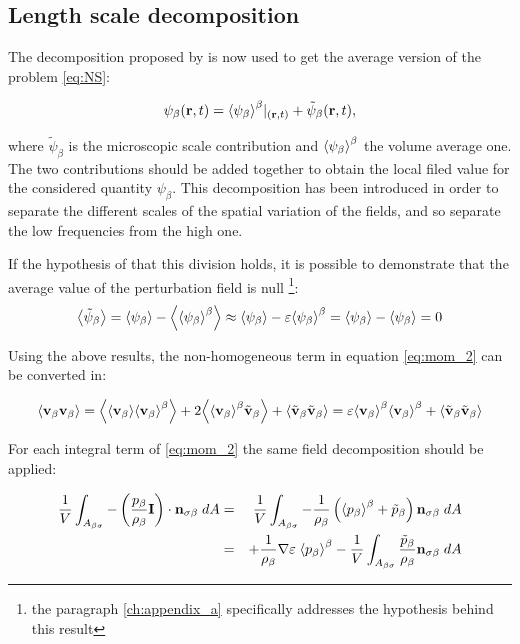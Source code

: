 \subsection{Length scale decomposition}

The decomposition proposed by \citet{gray1975derivation} is now used to get the average version of the problem \eqref{eq:NS}:

\begin{equation}
\psi_{\beta}(\mathbf{r},t) = {\left< \psi_{\beta} \right>}^{\beta}|_{(\mathbf{r},t)} + \tilde{\psi}_{\beta}(\mathbf{r},t),
\label{eq:gray}
\end{equation}

where $\tilde{\psi}_{\beta}$ is the microscopic scale contribution and $ {\left< \psi_{\beta} \right>}^{\beta}$ the volume average one.  The two contributions should be added together to obtain the local filed value for the considered quantity $\psi_{\beta}$.
This decomposition has been introduced in order to separate the different scales of the spatial variation of the fields, and so separate the low frequencies from the high one.

If the hypothesis of that this division holds, it is possible to demonstrate that the average value of the perturbation field is null \footnote{the paragraph \ref{ch:appendix_a} specifically addresses the hypothesis behind this result}:
$$
{\left< \tilde{\psi}_{\beta} \right>} = {\left< \psi_{\beta} \right>} - {\left< {\left< \psi_{\beta} \right>}^{\beta} \right>} \approx {\left< \psi_{\beta} \right>} -\varepsilon {\left< \psi_{\beta} \right>}^{\beta} = {\left< \psi_{\beta} \right>} -{\left< \psi_{\beta} \right>} = 0
$$


Using the above results, the non-homogeneous term in equation \eqref{eq:mom_2} can be converted in:

\begin{equation}
{\left< \textbf{v}_{\beta}\textbf{v}_{\beta}\right>} = {\left< {\left< \textbf{v}_{\beta} \right>}{\left< \textbf{v}_{\beta} \right>}^{\beta} \right>} +2{\left< {\left< \textbf{v}_{\beta} \right>}^{\beta}\tilde{\textbf{v}}_{\beta} \right>} +{\left< \tilde{\textbf{v}}_{\beta} \tilde{\textbf{v}}_{\beta} \right>} = \varepsilon {\left< \textbf{v}_{\beta}\right>}^{\beta}{\left< \textbf{v}_{\beta} \right>}^{\beta} +{\left< \tilde{\textbf{v}}_{\beta}\tilde{\textbf{v}}_{\beta} \right>}
\label{eq:dec_1}
\end{equation}

For each integral term of \eqref{eq:mom_2} the same field decomposition should be applied:

\begin{eqnarray}
\dfrac{1}{V} \int_{A_{\beta \sigma}}  - \left( \dfrac{p_{\beta}}{\rho_{\beta}} \mathbf{I} \right) \cdot \mathbf{n}_{\sigma \beta} \;dA &=& \dfrac{1}{V} \int_{A_{\beta \sigma}}  -\dfrac{1}{\rho_{\beta}} \left({\left< p_{\beta} \right>}^{\beta}   + \tilde{p}_{\beta} \right)  \mathbf{n}_{\sigma \beta} \;dA  \nonumber \\
&=& +\dfrac{1}{\rho_{\beta}}\nabla\varepsilon \; {\left< p_{\beta} \right>}^{\beta} - \dfrac{1}{V} \int_{A_{\beta \sigma}}  \dfrac{\tilde{p}_{\beta}}{\rho_{\beta}}  \mathbf{n}_{\sigma \beta} \;dA
\end{eqnarray}


